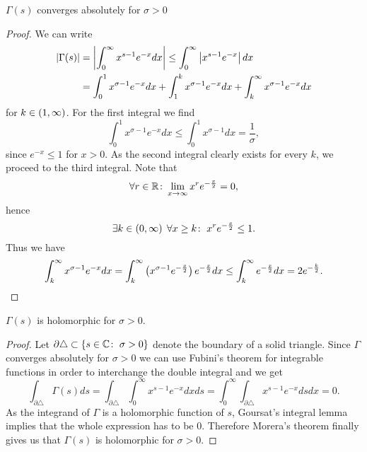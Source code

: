 \begin{theorem}
	$\Gamma(s)$ converges absolutely for $\sigma > 0$
\end{theorem}
\begin{proof}
	We can write
\begin{equation*}
\begin{aligned}
	\left|\Gamma(s)\right|
	&= \left|\int _0 ^\infty x^{s - 1} e^{-x} dx\right| \leq \int _0 ^\infty \left|x^{s - 1} e^{-x}\right| dx \\
	&= \int _0 ^1 x^{\sigma - 1} e^{-x} dx + \int _1 ^k x^{\sigma - 1} e^{-x} dx + \int _k ^\infty x^{\sigma - 1} e^{-x} dx
\end{aligned}
\end{equation*}
	for $k \in \left(1, \infty\right)$. For the first integral we find
\begin{equation*}
	\int _0 ^1 x^{\sigma - 1} e^{-x} dx \leq \int _0 ^1 x^{\sigma - 1} dx = \frac{1}{\sigma},
\end{equation*}
	since $e^{-x} \leq 1$ for $x > 0$. As the second integral clearly exists for every $k$, we proceed to the third integral. Note that
\begin{equation*}
	\forall r \in \mathbb{R} \colon \lim\limits_{x \to \infty} x^r e^{-\frac{x}{2}} = 0,
\end{equation*}
 	hence
\begin{equation*}
	\exists k \in \left(0, \infty\right) \; \forall x \geq k \colon \; x^r e^{-\frac{x}{2}} \leq 1.
\end{equation*}
	Thus we have
\begin{equation*}
	\int _k ^\infty x^{\sigma - 1} e^{-x} dx = \int _k ^\infty \left(x^{\sigma - 1} e^{-\frac{x}{2}}\right) e^{-\frac{x}{2}} dx \leq \int _k ^\infty e^{-\frac{x}{2}} dx = 2 e^{-\frac{k}{2}}.
\end{equation*}
\end{proof}


\begin{theorem}
	$\Gamma(s)$ is holomorphic for $\sigma > 0$.
\end{theorem}
\begin{proof}
	Let $\partial \triangle \subset \{ s \in \mathbb{C} \colon \; \sigma > 0 \}$ denote the boundary of a solid triangle. Since $\Gamma$ converges absolutely for $\sigma > 0$ we can use Fubini's theorem for integrable functions in order to interchange the double integral and we get
\begin{equation*}
	\int _{\partial \triangle} \Gamma(s) ds = \int _{\partial \triangle} \int _0 ^\infty x^{s - 1} e^{-x} dx ds = \int _0 ^\infty \int _{\partial \triangle} x^{s - 1} e^{-x} ds dx = 0.
\end{equation*}
	As the integrand of $\Gamma$ is a holomorphic function of $s$, Goursat's integral lemma implies that the whole expression has to be $0$. Therefore Morera's theorem finally gives us that $\Gamma(s)$ is holomorphic for $\sigma > 0$.
\end{proof}


